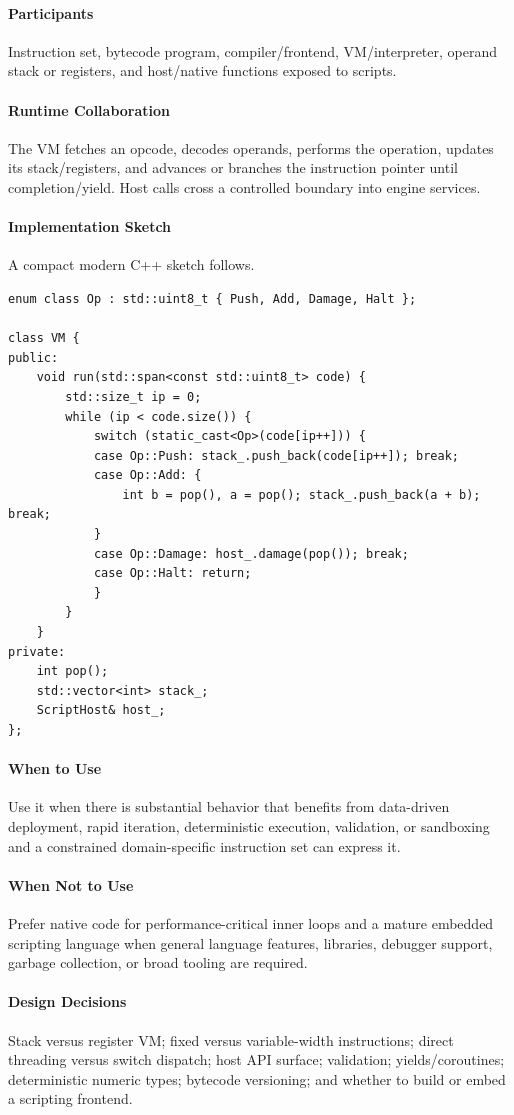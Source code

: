 \documentclass[11pt]{article}
\begin{document}
\paragraph{Participants} Instruction set, bytecode program, compiler/frontend, VM/interpreter, operand stack or registers, and host/native functions exposed to scripts.
\paragraph{Runtime Collaboration} The VM fetches an opcode, decodes operands, performs the operation, updates its stack/registers, and advances or branches the instruction pointer until completion/yield. Host calls cross a controlled boundary into engine services.
\paragraph{Implementation Sketch} A compact modern C++ sketch follows.
\begin{lstlisting}
enum class Op : std::uint8_t { Push, Add, Damage, Halt };

class VM {
public:
    void run(std::span<const std::uint8_t> code) {
        std::size_t ip = 0;
        while (ip < code.size()) {
            switch (static_cast<Op>(code[ip++])) {
            case Op::Push: stack_.push_back(code[ip++]); break;
            case Op::Add: {
                int b = pop(), a = pop(); stack_.push_back(a + b); break;
            }
            case Op::Damage: host_.damage(pop()); break;
            case Op::Halt: return;
            }
        }
    }
private:
    int pop();
    std::vector<int> stack_;
    ScriptHost& host_;
};
\end{lstlisting}
\paragraph{When to Use} Use it when there is substantial behavior that benefits from data-driven deployment, rapid iteration, deterministic execution, validation, or sandboxing and a constrained domain-specific instruction set can express it.
\paragraph{When Not to Use} Prefer native code for performance-critical inner loops and a mature embedded scripting language when general language features, libraries, debugger support, garbage collection, or broad tooling are required.
\paragraph{Design Decisions} Stack versus register VM; fixed versus variable-width instructions; direct threading versus switch dispatch; host API surface; validation; yields/coroutines; deterministic numeric types; bytecode versioning; and whether to build or embed a scripting frontend.
\end{document}
